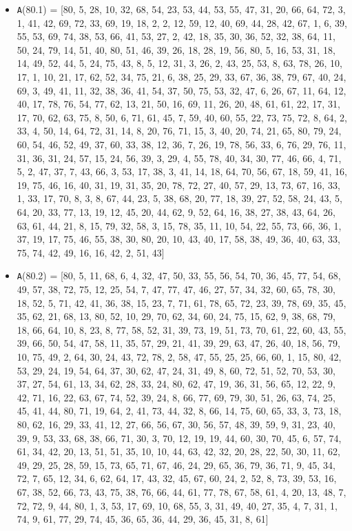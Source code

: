 \documentclass[runningheads, a4paper]{llncs}
\begin{document}
\begin{itemize}
	\item {\texttt A(80.1) = } [80, 5, 28, 10, 32, 68, 54, 23, 53, 44, 53, 55, 47, 31, 20, 66, 64, 72, 3, 1, 41, 42, 69, 72, 33, 69, 19, 18, 2, 2, 12, 59, 12, 40, 69, 44, 28, 42, 67, 1, 6, 39, 55, 53, 69, 74, 38, 53, 66, 41, 53, 27, 2, 42, 18, 35, 30, 36, 52, 32, 38, 64, 11, 50, 24, 79, 14, 51, 40, 80, 51, 46, 39, 26, 18, 28, 19, 56, 80, 5, 16, 53, 31, 18, 14, 49, 52, 44, 5, 24, 75, 43, 8, 5, 12, 31, 3, 26, 2, 43, 25, 53, 8, 63, 78, 26, 10, 17, 1, 10, 21, 17, 62, 52, 34, 75, 21, 6, 38, 25, 29, 33, 67, 36, 38, 79, 67, 40, 24, 69, 3, 49, 41, 11, 32, 38, 36, 41, 54, 37, 50, 75, 53, 32, 47, 6, 26, 67, 11, 64, 12, 40, 17, 78, 76, 54, 77, 62, 13, 21, 50, 16, 69, 11, 26, 20, 48, 61, 61, 22, 17, 31, 17, 70, 62, 63, 75, 8, 50, 6, 71, 61, 45, 7, 59, 40, 60, 55, 22, 73, 75, 72, 8, 64, 2, 33, 4, 50, 14, 64, 72, 31, 14, 8, 20, 76, 71, 15, 3, 40, 20, 74, 21, 65, 80, 79, 24, 60, 54, 46, 52, 49, 37, 60, 33, 38, 12, 36, 7, 26, 19, 78, 56, 33, 6, 76, 29, 76, 11, 31, 36, 31, 24, 57, 15, 24, 56, 39, 3, 29, 4, 55, 78, 40, 34, 30, 77, 46, 66, 4, 71, 5, 2, 47, 37, 7, 43, 66, 3, 53, 17, 38, 3, 41, 14, 18, 64, 70, 56, 67, 18, 59, 41, 16, 19, 75, 46, 16, 40, 31, 19, 31, 35, 20, 78, 72, 27, 40, 57, 29, 13, 73, 67, 16, 33, 1, 33, 17, 70, 8, 3, 8, 67, 44, 23, 5, 38, 68, 20, 77, 18, 39, 27, 52, 58, 24, 43, 5, 64, 20, 33, 77, 13, 19, 12, 45, 20, 44, 62, 9, 52, 64, 16, 38, 27, 38, 43, 64, 26, 63, 61, 44, 21, 8, 15, 79, 32, 58, 3, 15, 78, 35, 11, 10, 54, 22, 55, 73, 66, 36, 1, 37, 19, 17, 75, 46, 55, 38, 30, 80, 20, 10, 43, 40, 17, 58, 38, 49, 36, 40, 63, 33, 75, 74, 42, 49, 16, 16, 42, 2, 51, 43]
	\item {\texttt A(80.2) = } [80, 5, 11, 68, 6, 4, 32, 47, 50, 33, 55, 56, 54, 70, 36, 45, 77, 54, 68, 49, 57, 38, 72, 75, 12, 25, 54, 7, 47, 77, 47, 46, 27, 57, 34, 32, 60, 65, 78, 30, 18, 52, 5, 71, 42, 41, 36, 38, 15, 23, 7, 71, 61, 78, 65, 72, 23, 39, 78, 69, 35, 45, 35, 62, 21, 68, 13, 80, 52, 10, 29, 70, 62, 34, 60, 24, 75, 15, 62, 9, 38, 68, 79, 18, 66, 64, 10, 8, 23, 8, 77, 58, 52, 31, 39, 73, 19, 51, 73, 70, 61, 22, 60, 43, 55, 39, 66, 50, 54, 47, 58, 11, 35, 57, 29, 21, 41, 39, 29, 63, 47, 26, 40, 18, 56, 79, 10, 75, 49, 2, 64, 30, 24, 43, 72, 78, 2, 58, 47, 55, 25, 25, 66, 60, 1, 15, 80, 42, 53, 29, 24, 19, 54, 64, 37, 30, 62, 47, 24, 31, 49, 8, 60, 72, 51, 52, 70, 53, 30, 37, 27, 54, 61, 13, 34, 62, 28, 33, 24, 80, 62, 47, 19, 36, 31, 56, 65, 12, 22, 9, 42, 71, 16, 22, 63, 67, 74, 52, 39, 24, 8, 66, 77, 69, 79, 30, 51, 26, 63, 74, 25, 45, 41, 44, 80, 71, 19, 64, 2, 41, 73, 44, 32, 8, 66, 14, 75, 60, 65, 33, 3, 73, 18, 80, 62, 16, 29, 33, 41, 12, 27, 66, 56, 67, 30, 56, 57, 48, 39, 59, 9, 31, 23, 40, 39, 9, 53, 33, 68, 38, 66, 71, 30, 3, 70, 12, 19, 19, 44, 60, 30, 70, 45, 6, 57, 74, 61, 34, 42, 20, 13, 51, 51, 35, 10, 10, 44, 63, 42, 32, 20, 28, 22, 50, 30, 11, 62, 49, 29, 25, 28, 59, 15, 73, 65, 71, 67, 46, 24, 29, 65, 36, 79, 36, 71, 9, 45, 34, 72, 7, 65, 12, 34, 6, 62, 64, 17, 43, 32, 45, 67, 60, 24, 2, 52, 8, 73, 39, 53, 16, 67, 38, 52, 66, 73, 43, 75, 38, 76, 66, 44, 61, 77, 78, 67, 58, 61, 4, 20, 13, 48, 7, 72, 72, 9, 44, 80, 1, 3, 53, 17, 69, 10, 68, 55, 3, 31, 49, 40, 27, 35, 4, 7, 31, 1, 74, 9, 61, 77, 29, 74, 45, 36, 65, 36, 44, 29, 36, 45, 31, 8, 61]

\end{itemize}
\end{document}
